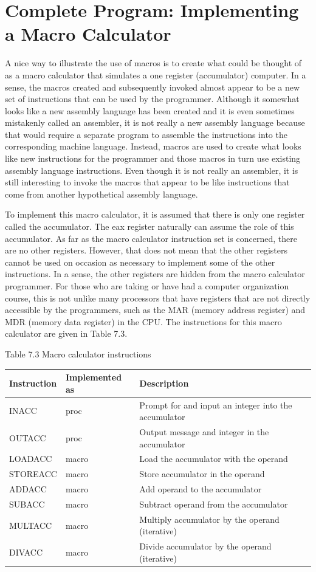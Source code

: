 \documentclass[10pt]{book}
\begin{document}
\section{Complete Program: Implementing a Macro Calculator}
A nice way to illustrate the use of macros is to create what could be thought of as a macro calculator that simulates a one register (accumulator) computer. In a sense, the macros created and subsequently invoked almost appear to be a new set of instructions that can be used by the programmer. Although it somewhat looks like a new assembly language has been created and it is even sometimes mistakenly called an assembler, it is not really a new assembly language because that would require a separate program to assemble the instructions into the corresponding machine language. Instead, macros are used to create what looks like new instructions for the programmer and those macros in turn use existing assembly language instructions. Even though it is not really an assembler, it is still interesting to invoke the macros that appear to be like instructions that come from another hypothetical assembly language.

To implement this macro calculator, it is assumed that there is only one register called the accumulator. The eax register naturally can assume the role of this accumulator. As far as the macro calculator instruction set is concerned, there are no other registers. However, that does not mean that the other registers cannot be used on occasion as necessary to implement some of the other instructions. In a sense, the other registers are hidden from the macro calculator programmer. For those who are taking or have had a computer organization course, this is not unlike many processors that have registers that are not directly accessible by the programmers, such as the MAR (memory address register) and MDR (memory data register) in the CPU. The instructions for this macro calculator are given in Table 7.3.

Table 7.3 Macro calculator instructions
\begin{center}
\begin{tabular}{|l|l|l|}
\hline
\textbf{Instruction} & \textbf{Implemented as} & \textbf{Description} \\
\hline
INACC & proc & Prompt for and input an integer into the accumulator \\
OUTACC & proc & Output message and integer in the accumulator \\
LOADACC & macro & Load the accumulator with the operand \\
STOREACC & macro & Store accumulator in the operand \\
ADDACC & macro & Add operand to the accumulator \\
SUBACC & macro & Subtract operand from the accumulator \\
MULTACC & macro & Multiply accumulator by the operand (iterative) \\
DIVACC & macro & Divide accumulator by the operand (iterative) \\
\hline
\end{tabular}
\end{center}
\end{document}

